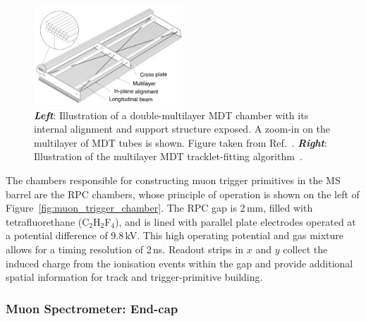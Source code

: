 \begin{figure}[!htb]
    \begin{center}
        \includegraphics[width=0.5\textwidth]{figures/chapter2/muon_spec/mdt_chamber}
        \caption{
            \textbf{\textit{Left}}: Illustration of a double-multilayer MDT chamber with its internal alignment
                and support structure exposed. A zoom-in on the multilayer of MDT tubes is shown.
                Figure taken from Ref.~\cite{CERN-LHCC-97-022}.
            \textbf{\textit{Right}}: Illustration of the multilayer MDT tracklet-fitting algorithm~\cite{MDTtrackfit}.
        }
        \label{fig:mdt_chamber}
    \end{center}
\end{figure}

The chambers responsible for constructing muon trigger primitives in the MS barrel
are the RPC chambers, whose principle of operation is shown on the left of Figure~\ref{fig:muon_trigger_chamber}. 
The RPC gap is 2\,mm, filled with tetrafluorethane (C$_2$H$_2$F$_4$), and is lined with
parallel plate electrodes operated at a potential difference of 9.8\,kV. This high operating
potential and gas mixture allows for a timing resolution of 2\,ns. Readout strips in $x$ and $y$
collect the induced charge from the ionisation events within the gap and provide
additional spatial information for track and trigger-primitive building.

\subsubsection{Muon Spectrometer: End-cap}
\label{sec:ms_endcap}

